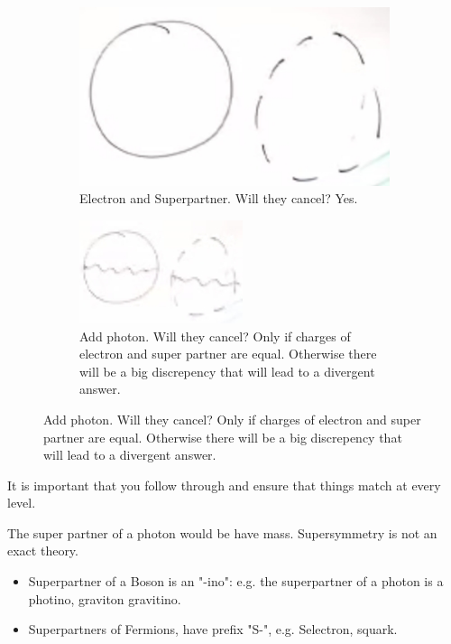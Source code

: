 \documentclass[]{article}
\begin{document}
\begin{figure}[H]
	\caption{Is the coupling constant stopping us from seeing superpartners?}
	\begin{subfigure}[t]{0.45\textwidth}
		\caption{Electron and Superpartner. Will they cancel? Yes.}\label{fig:particles3-2-2loops}
		\includegraphics[width=\textwidth]{particles3-2-2loops}
	\end{subfigure}
	\begin{subfigure}[t]{0.45\textwidth}
		\caption{Add photon. Will they cancel? Only if charges of electron and super partner are equal. Otherwise there will be a big discrepency that will lead to a divergent answer.}\label{fig:particles3-2-2loops-photons}
		\includegraphics{particles3-2-2loops-photons}
	\end{subfigure}
\end{figure}

It is important that you follow through and ensure that things match at every level.

The super partner of a photon would be have mass. Supersymmetry is not an exact theory.

\begin{itemize}
	\item Superpartner of a Boson is an "-ino": e.g. the superpartner of a photon is a photino, graviton gravitino.
	\item Superpartners of Fermions, have prefix "S-", e.g. Selectron, squark.
\end{itemize}
\end{document}
